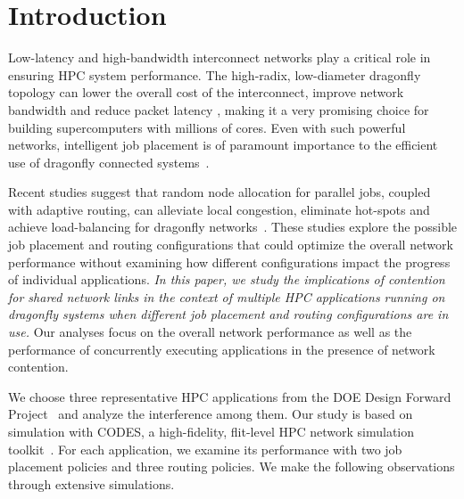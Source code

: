 \section{Introduction}
\label{sec:intro}

Low-latency and high-bandwidth interconnect networks play a critical role in ensuring HPC system performance. 
The high-radix, low-diameter dragonfly topology can lower the overall cost of the interconnect, improve network bandwidth and reduce packet latency \cite{dally-dragonfly}, 
making it a very promising choice for building supercomputers with millions of cores.
Even with such powerful networks, 
intelligent job placement is of paramount importance to the efficient use of dragonfly connected systems~\cite{bhatele:ipdps2016, jain-sc14}.

Recent studies suggest that random node allocation for parallel jobs, coupled
with adaptive routing, can alleviate local congestion, eliminate hot-spots and achieve load-balancing for dragonfly networks~\cite{jain-sc14, bhatele-sc11, brandt2014}. 
These studies explore the possible job placement and routing configurations that could optimize the overall network performance without examining how different configurations impact the progress of individual applications.
\emph{In this paper, we study the implications of contention for shared network links in the context of multiple HPC applications running on dragonfly systems when different job placement and routing configurations are in use.}
Our analyses focus on the overall network performance as well as the performance of concurrently executing applications in the presence of network contention.



We choose three representative HPC applications from the DOE Design Forward Project~\cite{designforward-webpage} and analyze the interference among them. Our study is based on simulation with CODES, a high-fidelity, flit-level HPC network simulation toolkit~\cite{misbah-tpds}. 
For each application, we examine its performance with two job placement policies and three routing policies.
We make the following observations through extensive simulations.


